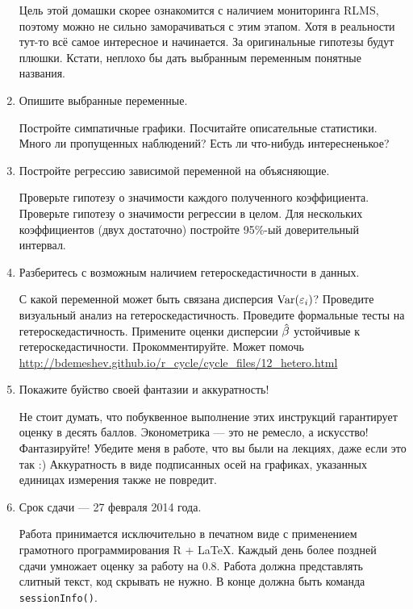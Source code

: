 \documentclass[12pt, a4paper]{article}\usepackage[]{graphicx}\usepackage[]{color}
\begin{document}
\begin{enumerate}
Цель этой домашки скорее ознакомится с наличием мониторинга RLMS, поэтому можно не сильно заморачиваться с этим этапом. Хотя в реальности тут-то всё самое интересное и начинается. За оригинальные гипотезы будут плюшки. Кстати, неплохо бы дать выбранным переменным понятные названия.

\item Опишите выбранные переменные.

Постройте симпатичные графики. Посчитайте описательные статистики. Много ли пропущенных наблюдений? Есть ли что-нибудь интересненькое?

\item Постройте регрессию зависимой переменной на объясняющие.

Проверьте гипотезу о значимости каждого полученного коэффициента. Проверьте гипотезу о значимости регрессии в целом. Для нескольких коэффициентов (двух достаточно) постройте 95\%-ый доверительный интервал.

\item Разберитесь с возможным наличием гетероскедастичности в данных.

С какой переменной может быть связана дисперсия $\operatorname{Var}(\varepsilon_i)$? Проведите визуальный анализ на гетероскедастичность. Проведите формальные тесты на гетероскедастичность. Примените оценки дисперсии $\hat{\beta}$ устойчивые к гетероскедастичности. Прокомментируйте. Может помочь \url{http://bdemeshev.github.io/r_cycle/cycle_files/12_hetero.html}

\item Покажите буйство своей фантазии и аккуратность!

Не стоит думать, что побуквенное выполнение этих инструкций гарантирует оценку в десять баллов. Эконометрика — это не ремесло, а искусство! Фантазируйте! Убедите меня в работе, что вы были на лекциях, даже если это так :) Аккуратность в виде подписанных осей на графиках, указанных единицах измерения также не повредит.

\item Срок сдачи — 27 февраля 2014 года.

Работа принимается исключительно в печатном виде с применением грамотного программирования R + \LaTeX. Каждый день более поздней сдачи умножает оценку за работу на $0.8$.  Работа должна представлять слитный текст, код скрывать не нужно. В конце должна быть команда \verb|sessionInfo()|.





\end{enumerate}
\end{document}
